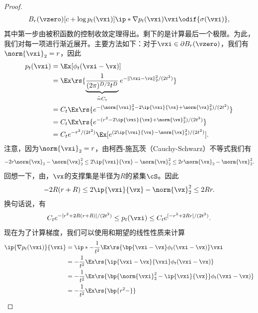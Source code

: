 \documentclass[../../book-main_zh.tex]{subfiles}
\begin{document}
\begin{proof}
\begin{align}
{        B_{r}(\vzero)}[c + \log p_{t}(\vxi)]\ip*{\nabla
        p_{t}(\vxi)}{\vxi}\odif{\sigma(\vxi)},
    \end{align}
    其中第一步由被积函数的控制收敛定理得出。剩下的是计算最后一个极限。为此，我们对每一项进行渐近展开。主要方法如下：对于\(\vxi \in \partial B_{r}(\vzero)\)，我们有\(\norm{\vxi}_{2} = r\)，因此
    \begin{align}
        p_{t}(\vxi)
        &= \Ex[\phi_{t}(\vxi - \vx)] \\
        &= \Ex\rs{\underbrace{\frac{1}{(2\pi)^{D/2}t^{D}}}_{\doteq
        C_{t}}e^{-\|\vxi - \vx\|_{2}^{2}/(2t^{2})}} \\
        &= C_{t}\Ex\rs{e^{-(\norm{\vxi}_{2}^{2} - 2\ip{\vxi}{\vx} +
        \norm{\vx}_{2}^{2})/(2t^{2})}} \\
        &= C_{t}\Ex\rs{e^{-(r^{2} - 2\ip{\vxi}{\vx} +
        \norm{\vx}_{2}^{2})/(2t^{2})}} \\
        &= C_{t}e^{-r^{2}/(2t^{2})}\Ex[e^{(2\ip{\vxi}{\vx} -
        \norm{\vx}_{2}^{2})/(2t^{2})}].
    \end{align}
    注意，因为\(\norm{\vxi}_{2} = r\)，由柯西-施瓦茨（Cauchy-Schwarz）不等式我们有
    \begin{equation}
        -2r\norm{\vx}_{2} - \norm{\vx}_{2}^{2} \leq 2\ip{\vxi}{\vx} -
        \norm{\vx}_{2}^{2} \leq 2r\norm{\vx}_{2} - \norm{\vx}_{2}^{2}.
    \end{equation}
    回想一下，由，\(\vx\)的支撑集是半径为\(R\)的紧集\(\cS\)。因此
    \begin{equation}
        -2R(r + R) \leq 2\ip{\vxi}{\vx} - \norm{\vx}_{2}^{2} \leq 2Rr.
    \end{equation}
    换句话说，有
    \begin{equation}
        C_{t}e^{-[r^{2} + 2R(r + R)]/(2t^{2})} \leq p_{t}(\vxi) \leq
        C_{t}e^{[-r^{2} + 2Rr]/(2t^{2})}.
    \end{equation}
    现在为了计算梯度，我们可以使用和期望的线性性质来计算
    \begin{align}
        \ip{\nabla p_{t}(\vxi)}{\vxi}
        &= \ip*{-\frac{1}{t^{2}}\Ex\rs{\bp{\vxi - \vx}\phi_{t}(\vxi -
        \vx)}}{\vxi} \\
        &= -\frac{1}{t^{2}}\Ex\rs{\ip{\vxi - \vx}{\vxi}\phi_{t}(\vxi - \vx)} \\
        &= -\frac{1}{t^{2}}\Ex\rs{\bp{\norm{\vxi}_{2}^{2} -
        \ip{\vxi}{\vx}}\phi_{t}(\vxi - \vx)} \\
        &= -\frac{1}{t^{2}}\Ex\rs{\bp{r^{2} -
}}
\end{align}
\end{proof}
\end{document}
